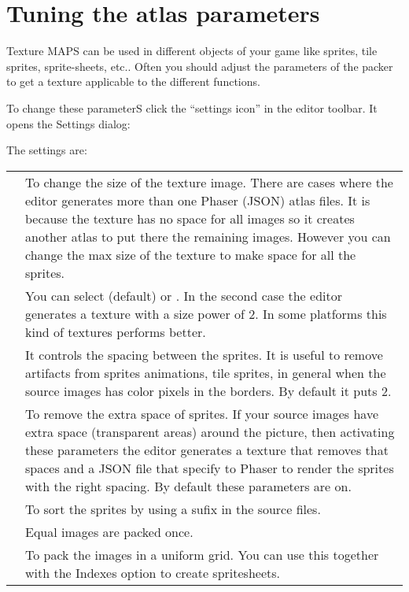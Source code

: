 \documentclass[letterpaper,10pt,english]{sphinxmanual}
\begin{document}
\section{Tuning the atlas parameters}
\label{\detokenize{texture_packer:tuning-the-atlas-parameters}}
Texture MAPS can be used in different objects of your game like sprites, tile sprites, sprite-sheets, etc.. Often you should adjust the parameters of the packer to get a texture applicable to the different functions.

To change these parameterS click the “settings icon” in the editor toolbar. It opens the Settings dialog:

\noindent{}

The settings are:


\begin{savenotes}\sphinxattablestart
\centering
\begin{tabulary}{\linewidth}[t]{|T|T|}
\hline
{}\relax &\relax \\
\hline
{}
&
To change the size of the texture image. There are cases where the editor generates more than one Phaser (JSON) atlas files. It is because the texture has no space for all images so it creates another atlas to put there the remaining images. However you can change the max size of the texture to make space for all the sprites.
\\
\hline
{}
&
You can select  (default) or . In the second case the editor generates a texture with a size power of 2. In some platforms this kind of textures performs better.
\\
\hline
{}
&
It controls the spacing between the sprites. It is useful to remove artifacts from sprites animations, tile sprites, in general when the source images has color pixels in the borders. By default it puts 2.
\\
\hline
{}
&
To remove the extra space of sprites. If your source images have extra space (transparent areas) around the picture, then activating these parameters the editor generates a texture that removes that spaces and a JSON file that specify to Phaser to render the sprites with the right spacing. By default these parameters are on.
\\
\hline
{}
&
To sort the sprites by using a  sufix in the source files.
\\
\hline
{}
&
Equal images are packed once.
\\
\hline
{}
&
To pack the images in a uniform grid. You can use this together with the Indexes option to create spritesheets.
\\
\hline
\end{tabulary}
\par
\sphinxattableend\end{savenotes}
\end{document}

